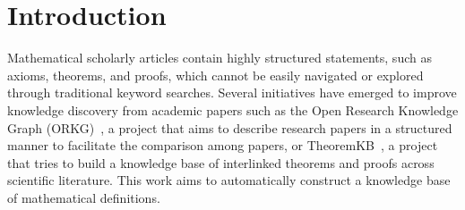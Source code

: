 \section{Introduction}

Mathematical scholarly articles contain highly structured statements, such as axioms, theorems, and proofs, which cannot be easily navigated or explored through traditional keyword searches. 
Several initiatives have emerged to improve knowledge discovery from academic papers such as the
Open Research Knowledge Graph (ORKG)~\cite{auer2020orkg}, a project that aims to describe research papers in a structured manner to facilitate the comparison among papers,
or TheoremKB~\cite{mishra2024first,mishraPS21}, a project that tries to build a knowledge base of interlinked theorems and proofs across scientific literature. 
This work aims to automatically construct a knowledge base of mathematical definitions. %

